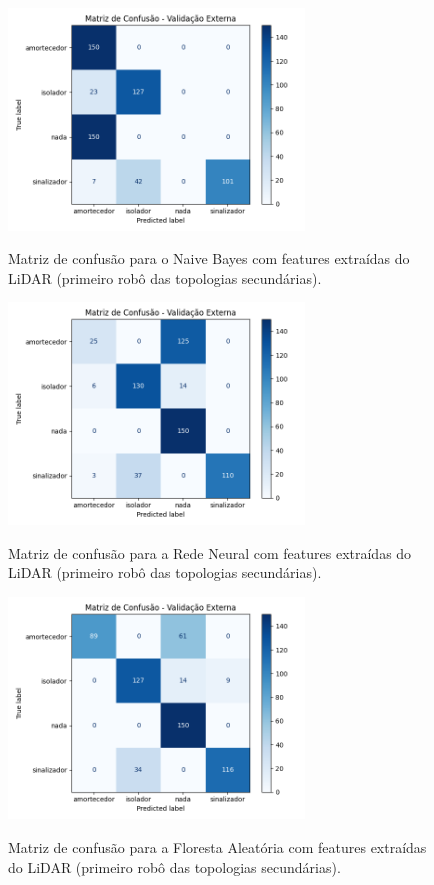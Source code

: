 \begin{figure}[H]
\centering
\caption{Matriz de confusão para o Naive Bayes com features extraídas do LiDAR (primeiro robô das topologias secundárias).}
\includegraphics[width=0.7\textwidth]{figuras/Resultados/multi_primeiro_Teste4_naive.png}
\label{fig:mc_featlidar_naive_robo1_t4}
\fonte{}
\end{figure}

\begin{figure}[H]
\centering
\caption{Matriz de confusão para a Rede Neural com features extraídas do LiDAR (primeiro robô das topologias secundárias).}
\includegraphics[width=0.7\textwidth]{figuras/Resultados/multi_primeiro_Teste4_nn.png}
\label{fig:mc_featlidar_nn_robo1_t4}
\fonte{}
\end{figure}

\begin{figure}[H]
\centering
\caption{Matriz de confusão para a Floresta Aleatória com features extraídas do LiDAR (primeiro robô das topologias secundárias).}
\includegraphics[width=0.7\textwidth]{figuras/Resultados/multi_primeiro_Teste4_rf.png}
\label{fig:mc_featlidar_rf_robo1_t4}
\fonte{}
\end{figure}

